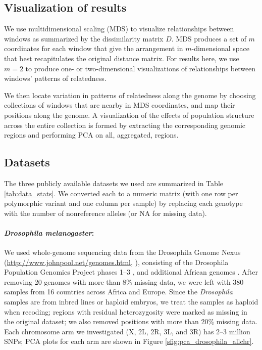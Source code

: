 \documentclass[11pt, oneside]{article}   	%
\begin{document}
\subsection{Visualization of results}

We use multidimensional scaling (MDS) to visualize relationships between windows
as summarized by the dissimilarity matrix $D$.
MDS produces a set of $m$ coordinates for each window that
give the arrangement in $m$-dimensional space that best recapitulates the original distance matrix.
For results here, we use $m=2$ to produce one- or two-dimensional visualizations of relationships between windows' patterns of relatedness.

We then locate variation in patterns of relatedness along the genome
by choosing collections of windows that are nearby in MDS coordinates,
and map their positions along the genome.
A visualization of the effects of population structure across the entire collection is formed by extracting the corresponding genomic regions
and performing PCA on all, aggregated, regions.



\subsection{Datasets}

The three publicly available datasets we used are summarized in Table \ref{tab:data_stats}.
We converted each to a numeric matrix
(with one row per polymorphic variant and one column per sample)
by replacing each genotype with the number of nonreference alleles
(or NA for missing data).

\paragraph{\textit{Drosophila melanogaster}:}
We used whole-genome sequencing data 
from the Drosophila Genome Nexus (\url{http://www.johnpool.net/genomes.html}, \citep{lack2015drosophila}),
consisting of the Drosophila Population Genomics Project phases 1--3 \citep{langley2012genomic,pool2012population},
and additional African genomes \citep{lack2015drosophila}.
After removing 20 genomes with more than 8\% missing data,
we were left with 380 samples from 16 countries across Africa and Europe.
Since the \textit{Drosophila} samples are from inbred lines or haploid embryos, 
we treat the samples as haploid when recoding;
regions with residual heterozygosity were marked as missing in the original dataset;
we also removed positions with more than 20\% missing data. 
Each chromosome arm we investigated (X, 2L, 2R, 3L, and 3R) has 2--3 million SNPs;
PCA plots for each arm are shown in Figure \ref{sfig:pca_drosophila_allchr}.
\end{document}
